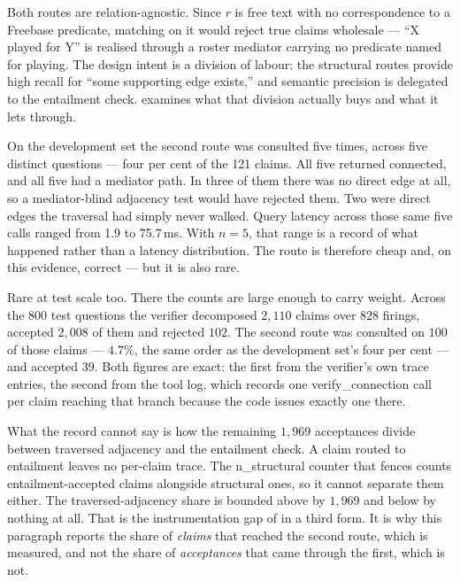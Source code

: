 Both routes are relation-agnostic. Since $r$ is free text with no correspondence
to a Freebase predicate, matching on it would reject true claims wholesale ---
``X played for Y'' is realised through a roster mediator carrying no predicate
named for playing. The design intent is a division of labour: the structural
routes provide high recall for ``some supporting edge exists,'' and semantic
precision is delegated to the entailment check. 
examines what that division actually buys and what it lets through.

On the development set the second route was consulted five times, across five
distinct questions --- four per cent of the 121 claims. All five returned
connected, and all five had a mediator path. In three of them there was no
direct edge at all, so a mediator-blind adjacency test would have rejected them.
Two were direct edges the traversal had simply never walked. Query latency
across those same five calls ranged from 1.9 to 75.7\,ms. With $n = 5$, that
range is a record of what happened rather than a latency distribution. The
route is therefore cheap and, on this evidence, correct --- but it is also rare.

Rare at test scale too. There the counts are large enough to carry weight.
Across the $800$ test questions the verifier decomposed $2{,}110$ claims over
$828$ firings, accepted $2{,}008$ of them and rejected $102$. The second route
was consulted on $100$ of those claims --- $4.7\%$, the same order as the
development set's four per cent --- and accepted $39$. Both figures are exact:
the first from the verifier's own trace entries, the second from the tool log,
which records one \textsf{verify\_connection} call per claim reaching that
branch because the code issues exactly one there.

What the record cannot say is how the remaining $1{,}969$ acceptances divide
between traversed adjacency and the entailment check. A claim routed to
entailment leaves no per-claim trace. The \textsf{n\_structural} counter that
 fences counts entailment-accepted claims alongside
structural ones, so it cannot separate them either. The traversed-adjacency
share is bounded above by $1{,}969$ and below by nothing at all. That is the
instrumentation gap of  in a third form. It is why this
paragraph reports the share of \emph{claims} that reached the second route,
which is measured, and not the share of \emph{acceptances} that came through
the first, which is not.

